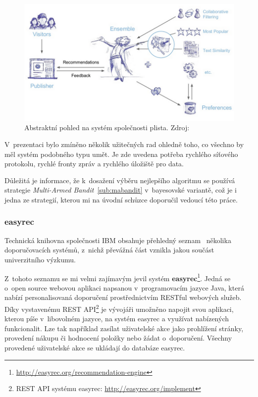 \documentclass[thesis=M,czech]{FITthesis}[2014/05/07]
\begin{document}
\begin{figure}\centering
	\includegraphics[width=1.0\textwidth]{obr/plistaEnsemble.png}
 	\caption[Abstraktní pohled na systém společnosti plista]{Abstraktní pohled na systém společnosti plista. Zdroj: \cite{slideshare:plista}}\label{fig:plista}
\end{figure}	

V~prezentaci bylo zmíněno několik užitečných rad ohledně toho, co všechno by měl systém podobného typu umět. Je zde uvedena potřeba rychlého síťového protokolu, rychlé fronty zpráv a rychlého úložiště pro data.

Důležitá je informace, že k~dosažení výběru nejlepšího algoritmu se používá strategie \emph{Multi-Armed Bandit}~\ref{sub:mabandit} v~bayesovské variantě, což je i jedna ze strategií, kterou mi na úvodní schůzce doporučil vedoucí této práce.

\subsubsection{easyrec}
Technická knihovna společnosti IBM obsahuje přehledný seznam~\cite{ibm} několika doporučovacích systémů, z~nichž převážná část vznikla jakou součást univerzitního výzkumu.

Z~tohoto seznamu se mi velmi zajímavým jevil systém \textbf{easyrec}\footnote{\url{http://easyrec.org/recommendation-engine}}. Jedná se o~open source webovou aplikaci napsanou v~programovacím jazyce Java, která nabízí personalisovaná doporučení prostřednictvím RESTful webových služeb. Díky vystavenému REST API\footnote{REST API systému easyrec: \url{http://easyrec.org/implement}} je vývojáři umožněno napojit svou aplikaci, kterou píše v~libovolném jazyce, na systém easyrec a využívat nabízených funkcionalit. Lze tak například zasílat uživatelské akce jako prohlížení stránky, provedení nákupu či hodnocení položky nebo žádat o~doporučení. Všechny provedené uživatelské akce se ukládají do databáze easyrec.
\end{document}
